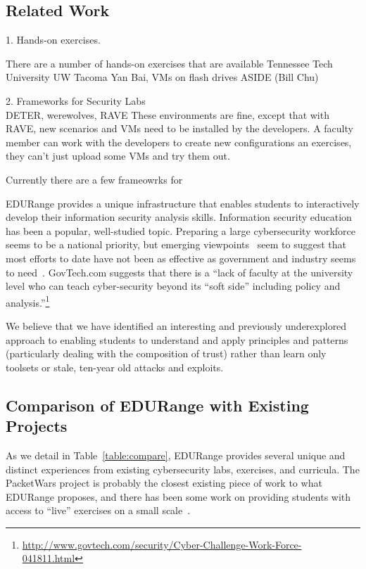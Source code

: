 \subsection{Related Work}
\label{ssec:related}
1. Hands-on exercises.

There are a number of hands-on exercises that are available 
Tennessee Tech University
UW Tacoma Yan Bai, VMs on flash drives 
ASIDE (Bill Chu)

2. Frameworks for Security Labs \\
DETER, werewolves, RAVE
These environments are fine, except that with RAVE, new scenarios and VMs need to be installed by
the developers.  A faculty member can work with the developers to create new configurations an exercises,
they can't just upload some VMs and try them out.

Currently there are a few frameowrks for 

EDURange provides a unique infrastructure that enables students to
interactively develop their information security analysis skills.
Information security education has been a popular, well-studied topic.
Preparing a large cybersecurity workforce seems to be a national
priority, but emerging viewpoints~\cite{cooper2009sigcse} seem to
suggest that most efforts to date have not been as effective as
government and industry seems to need~\cite{locasto2011cacm}.
GovTech.com suggests that there is a ``lack of faculty at the
university level who can teach cyber-security beyond its ``soft side''
including policy and
analysis.''\footnote{\url{http://www.govtech.com/security/Cyber-Challenge-Work-Force-041811.html}}

We believe that we have identified an interesting and previously
underexplored approach to enabling students to understand and apply
principles and patterns (particularly dealing with the composition of
trust) rather than learn only toolsets or stale, ten-year old attacks
and exploits.

\subsection{Comparison of EDURange with Existing Projects}

As we detail in Table~\ref{table:compare}, EDURange provides several
unique and distinct experiences from existing cybersecurity labs,
exercises, and curricula.  The PacketWars project is probably the
closest existing piece of work to what EDURange proposes, and there
has been some work on providing students with access to ``live''
exercises on a small scale~\cite{vigna}.

